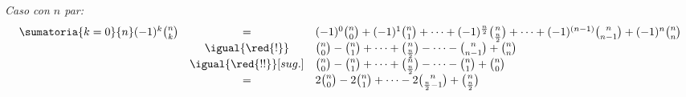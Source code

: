 \begin{enumerate}[label=\alph*)]
        \textit{Caso con $n$ par:}
        $$
          \begin{array}{rcl}
            \sumatoria{k = 0}{n} (-1)^k \binom{n}{k}
             & =                      &
            (-1)^0  \binom{n}{0} +
            (-1)^1  \binom{n}{1} +
            \cdots +
            (-1)^{\frac{n}{2}} \binom{n}{\frac{n}{2}} +
            \cdots +
            (-1)^{(n-1)} \binom{n}{n-1} +
            (-1)^n  \binom{n}{n}        \\
             & \igual{\red{!}}        &
            \binom{n}{0} -
            \binom{n}{1} +
            \cdots +
            \binom{n}{\frac{n}{2}} -
            \cdots -
            \binom{n}{n-1} +
            \binom{n}{n}                \\
             & \igual{\red{!!}}[sug.] &
            \binom{n}{0} -
            \binom{n}{1} +
            \cdots +
            \binom{n}{\frac{n}{2}} -
            \cdots -
            \binom{n}{1} +
            \binom{n}{0}                \\
             & =                      &
            2\binom{n}{0} -
            2\binom{n}{1} +
            \cdots -
            2\binom{n}{\frac{n}{2}-1} +
            \binom{n}{\frac{n}{2}}
          \end{array}
        $$


        \hacer


\end{enumerate}
